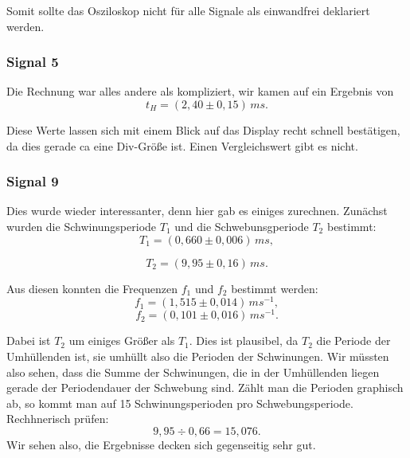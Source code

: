 Somit sollte das Osziloskop nicht für alle Signale als einwandfrei deklariert werden.

\subsubsection*{Signal 5}
Die Rechnung war alles andere als kompliziert, wir kamen auf ein Ergebnis von
\begin{equation}
\boxed{
    t_H = (2,40 \pm 0,15)\, ms
}.
\end{equation}

Diese Werte lassen sich mit einem Blick auf das Display recht schnell bestätigen, da dies gerade ca eine Div-Größe ist.
Einen Vergleichswert gibt es nicht.

\subsubsection*{Signal 9}
Dies wurde wieder interessanter, denn hier gab es einiges zurechnen. Zunächst wurden die Schwinungsperiode $T_1$ und die Schwebunsgperiode $T_2$ bestimmt:
\begin{equation}
\boxed{
    T_1 = (0,660 \pm 0,006) \, ms
},
\end{equation}

\begin{equation}
\boxed{
    T_{2} = (9,95 \pm 0,16) \, ms
}.
\end{equation}


Aus diesen konnten die Frequenzen $f_1$ und $f_2$ bestimmt werden:
\begin{equation}
\boxed{
    f_1 = (1,515 \pm 0,014) \, ms^{-1}
},
\end{equation}
\begin{equation}
\boxed{
    f_2 = (0,101 \pm 0,016) \, ms^{-1}
}.
\end{equation}

Dabei ist $T_2$ um einiges Größer als $T_1$. Dies ist plausibel, da $T_2$ die Periode der Umhüllenden ist, sie umhüllt also die Perioden der Schwinungen. Wir müssten also sehen, dass die Summe der Schwinungen, die in der Umhüllenden liegen gerade der Periodendauer der Schwebung sind. Zählt man die Perioden graphisch ab, so kommt man auf 15 Schwinungsperioden pro Schwebungsperiode. Rechhnerisch prüfen:
\begin{equation}
    9,95 \div 0,66 = 15,076.
\end{equation}
Wir sehen also, die Ergebnisse decken sich gegenseitig sehr gut.

